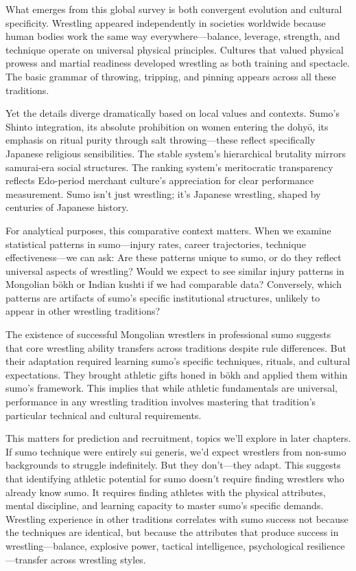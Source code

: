 What emerges from this global survey is both convergent evolution and cultural specificity. Wrestling appeared independently in societies worldwide because human bodies work the same way everywhere—balance, leverage, strength, and technique operate on universal physical principles. Cultures that valued physical prowess and martial readiness developed wrestling as both training and spectacle. The basic grammar of throwing, tripping, and pinning appears across all these traditions.

Yet the details diverge dramatically based on local values and contexts. Sumo's Shinto integration, its absolute prohibition on women entering the dohyō, its emphasis on ritual purity through salt throwing—these reflect specifically Japanese religious sensibilities. The stable system's hierarchical brutality mirrors samurai-era social structures. The ranking system's meritocratic transparency reflects Edo-period merchant culture's appreciation for clear performance measurement. Sumo isn't just wrestling; it's Japanese wrestling, shaped by centuries of Japanese history.

For analytical purposes, this comparative context matters. When we examine statistical patterns in sumo—injury rates, career trajectories, technique effectiveness—we can ask: Are these patterns unique to sumo, or do they reflect universal aspects of wrestling? Would we expect to see similar injury patterns in Mongolian bökh or Indian kushti if we had comparable data? Conversely, which patterns are artifacts of sumo's specific institutional structures, unlikely to appear in other wrestling traditions?

The existence of successful Mongolian wrestlers in professional sumo suggests that core wrestling ability transfers across traditions despite rule differences. But their adaptation required learning sumo's specific techniques, rituals, and cultural expectations. They brought athletic gifts honed in bökh and applied them within sumo's framework. This implies that while athletic fundamentals are universal, performance in any wrestling tradition involves mastering that tradition's particular technical and cultural requirements.

This matters for prediction and recruitment, topics we'll explore in later chapters. If sumo technique were entirely sui generis, we'd expect wrestlers from non-sumo backgrounds to struggle indefinitely. But they don't—they adapt. This suggests that identifying athletic potential for sumo doesn't require finding wrestlers who already know sumo. It requires finding athletes with the physical attributes, mental discipline, and learning capacity to master sumo's specific demands. Wrestling experience in other traditions correlates with sumo success not because the techniques are identical, but because the attributes that produce success in wrestling—balance, explosive power, tactical intelligence, psychological resilience—transfer across wrestling styles.
